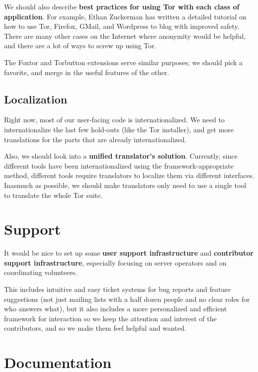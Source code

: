 \documentclass{article}
\newcommand{\tmp}[1]{{\bf #1} [......] \\}
\begin{document}
We should also describe {\bf best practices for using Tor with each class of
  application}. For example, Ethan Zuckerman has written a detailed
tutorial on how to use Tor, Firefox, GMail, and Wordpress to blog with
improved safety. There are many other cases on the Internet where anonymity
would be helpful, and there are a lot of ways to screw up using Tor.

The Foxtor and Torbutton extensions serve similar purposes; we should pick a
favorite, and merge in the useful features of the other.

%

\subsection{Localization}
Right now, most of our user-facing code is internationalized.  We need to
internationalize the last few hold-outs (like the Tor installer), and get
more translations for the parts that are already internationalized.


Also, we should look into a {\bf unified translator's solution}.  Currently,
since different tools have been internationalized using the
framework-appropriate method, different tools require translators to localize
them via different interfaces.  Inasmuch as possible, we should make
translators only need to use a single tool to translate the whole Tor suite.

\section{Support}

It would be nice to set up some {\bf user support infrastructure} and
{\bf contributor support infrastructure}, especially focusing on server
operators and on coordinating volunteers.

This includes intuitive and easy ticket systems for bug reports and
feature suggestions (not just mailing lists with a half dozen people
and no clear roles for who answers what), but it also includes a more
personalized and efficient framework for interaction so we keep the
attention and interest of the contributors, and so we make them feel
helpful and wanted.

\section{Documentation}
\end{document}
